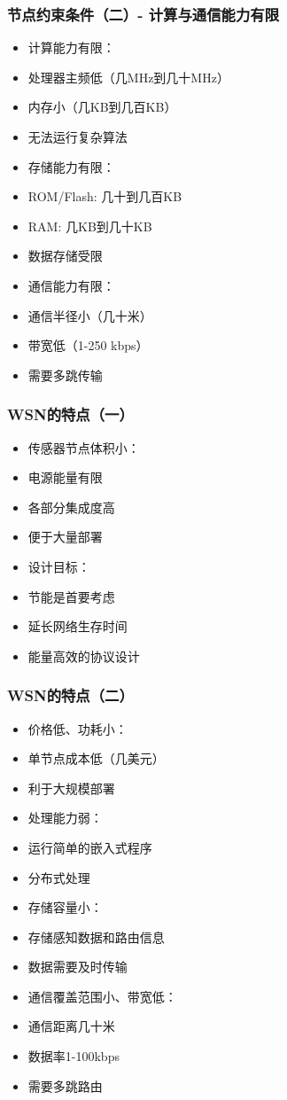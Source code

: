 \documentclass[aspectratio=43]{beamer}
\begin{document}
\begin{frame}
  \frametitle{节点约束条件（二）- 计算与通信能力有限}

  \begin{itemize}
  \item<+-> 计算能力有限：
  \item<+-> 处理器主频低（几MHz到几十MHz）
  \item<+-> 内存小（几KB到几百KB）
  \item<+-> 无法运行复杂算法
  \item<+-> 存储能力有限：
  \item<+-> ROM/Flash: 几十到几百KB
  \item<+-> RAM: 几KB到几十KB
  \item<+-> 数据存储受限
  \item<+-> 通信能力有限：
  \item<+-> 通信半径小（几十米）
  \item<+-> 带宽低（1-250 kbps）
  \item<+-> 需要多跳传输
  \end{itemize}
\end{frame}

\begin{frame}
  \frametitle{WSN的特点（一）}

  \begin{itemize}
  \item<+-> 传感器节点体积小：
  \item<+-> 电源能量有限
  \item<+-> 各部分集成度高
  \item<+-> 便于大量部署
  \item<+-> 设计目标：
  \item<+-> 节能是首要考虑
  \item<+-> 延长网络生存时间
  \item<+-> 能量高效的协议设计
  \end{itemize}
\end{frame}

\begin{frame}
  \frametitle{WSN的特点（二）}

  \begin{itemize}
  \item<+-> 价格低、功耗小：
  \item<+-> 单节点成本低（几美元）
  \item<+-> 利于大规模部署
  \item<+-> 处理能力弱：
  \item<+-> 运行简单的嵌入式程序
  \item<+-> 分布式处理
  \item<+-> 存储容量小：
  \item<+-> 存储感知数据和路由信息
  \item<+-> 数据需要及时传输
  \item<+-> 通信覆盖范围小、带宽低：
  \item<+-> 通信距离几十米
  \item<+-> 数据率1-100kbps
  \item<+-> 需要多跳路由
  \end{itemize}
\end{frame}
\end{document}
